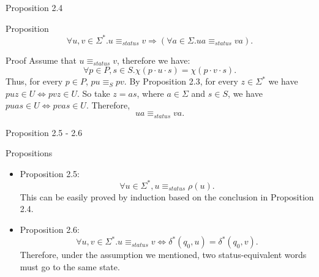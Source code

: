 \documentclass{beamer}
\begin{document}

\begin{frame}{Proposition 2.4}
    \begin{block}{Proposition}
        \[
            \forall u,v \in \Sigma^*. u \equiv_{status} v \Rightarrow (\forall a \in \Sigma. ua \equiv_{status} va).
        \]
    \end{block}
    \begin{block}{Proof}
        Assume that $u \equiv_{status} v$, therefore we have:
         \[
            \forall p\in P,s\in S. \chi(p\cdot u \cdot s) = \chi(p\cdot v \cdot s).
        \]
        Thus, for every $p \in P$, $pu \equiv_{S} pv$.
        By Proposition 2.3, for every $z \in \Sigma^*$ we have $puz \in U \iff pvz \in U$.
        So take $z = as$, where $a \in \Sigma$ and $s \in S$, we have $puas \in U \iff pvas \in U$.
        Therefore,
        \[
            ua \equiv_{status} va.
        \]
    \end{block}
\end{frame}

\begin{frame}{Proposition 2.5 - 2.6}
    \begin{block}{Propositions}
       \begin{itemize}
            \item Proposition 2.5:  
            \[
                \forall u \in \Sigma^*, u \equiv_{status} \rho(u).
            \]
            This can be easily proved by induction based on the conclusion in Proposition 2.4.
            \item Proposition 2.6: 
             \[
                \forall u,v \in \Sigma^*. u \equiv_{status} v \iff \delta^*(q_0,u) = \delta^*(q_0,v).
            \]
            Therefore, under the assumption we mentioned, two status-equivalent words must go to the same state. 
        \end{itemize}
    \end{block}
\end{frame}
\end{document}
